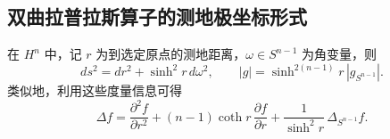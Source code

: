 \subsection{双曲拉普拉斯算子的测地极坐标形式}
在 $H^n$ 中，记 $r$ 为到选定原点的测地距离，$\omega\in S^{n-1}$ 为角变量，则
\[
  ds^2=dr^2+\sinh^2r\,d\omega^2,\qquad
  |g|=\sinh^{2(n-1)}r\,|g_{S^{n-1}}|.
\]
类似地，利用这些度量信息可得
\[
  \Delta f=\frac{\partial^2 f}{\partial r^2}
  +(n-1)\coth r\,\frac{\partial f}{\partial r}
  +\frac{1}{\sinh^2r}\,\Delta_{S^{n-1}}f.
\]
